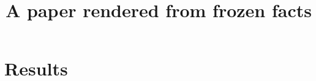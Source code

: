 \documentclass[11pt]{article}
\title{A paper rendered from frozen facts}
\author{}
\date{}
\begin{document}
\maketitle

\section{Results}

\end{document}
